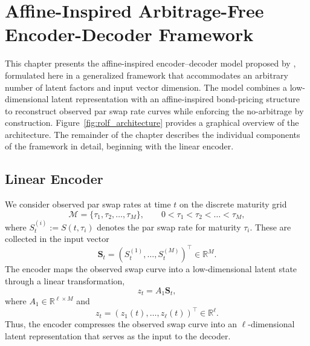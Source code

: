 \chapter[Affine-Inspired Arbitrage-Free Encoder-Decoder Framework]
{Affine-Inspired Arbitrage-Free\\Encoder-Decoder Framework}
\label{chap:encoderdecodermodel}


This chapter presents the affine-inspired encoder--decoder model proposed by \citet{MatinWanPoulsen2025}, formulated here in a generalized framework that accommodates an arbitrary number of latent factors and input vector dimension. The model combines a low-dimensional latent representation with an affine-inspired bond-pricing structure to reconstruct observed par swap rate curves while enforcing the no-arbitrage by construction. Figure~\ref{fig:rolf_architecture} provides a graphical overview of the architecture. The remainder of the chapter describes the individual components of the framework in detail, beginning with the linear encoder.






\section{Linear Encoder}

We consider observed par swap rates at time $t$ on the discrete maturity grid
\[
\mathcal{M}=\{\tau_1,\tau_2,\dots,\tau_M\}, \qquad 0<\tau_1<\tau_2<\dots<\tau_M,
\]
where $S_t^{(i)}:=S(t,\tau_i)$ denotes the par swap rate for maturity $\tau_i$. These are collected in the input vector
\[
\mathbf{S}_t=(S_t^{(1)},\dots,S_t^{(M)})^\top \in \mathbb{R}^M.
\]
The encoder maps the observed swap curve into a low-dimensional latent state through a linear transformation,
\begin{equation}
z_t = A_1 \mathbf{S}_t,
\label{eq:linear_encoder}
\end{equation}
where $A_1 \in \mathbb{R}^{\ell \times M}$ and
\[
z_t=(z_1(t),\dots,z_\ell(t))^\top \in \mathbb{R}^\ell.
\]
Thus, the encoder compresses the observed swap curve into an $\ell$-dimensional latent representation that serves as the input to the decoder.



